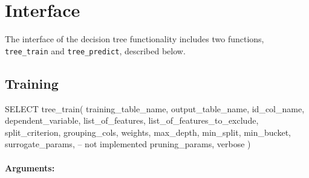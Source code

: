 \section{Interface} %
\label{sec:interface}
The interface of the decision tree functionality includes two functions,
\texttt{tree\_train} and \texttt{tree\_predict}, described below.

\subsection{Training} %
\label{sub:training}
\begin{sql}
    SELECT tree_train(
            training_table_name,
            output_table_name,
            id_col_name,
            dependent_variable,
            list_of_features,
            list_of_features_to_exclude,
            split_criterion,
            grouping_cols,
            weights,
            max_depth,
            min_split,
            min_bucket,
            surrogate_params,   -- not implemented
            pruning_params,
            verbose
    )
\end{sql}

\paragraph{Arguments:}

